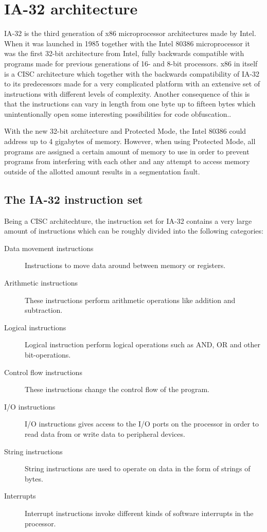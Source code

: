 \documentclass[11pt,twoside]{eitExjobb}
\begin{document}
\section{IA-32 architecture}
IA-32 is the third generation of  x86 microprocessor architectures made by Intel. When it was launched in 1985 together with the Intel 80386 microprocessor it was the first 32-bit architecture from Intel, fully backwards compatible with programs made for previous generations of 16- and 8-bit processors. x86 in itself is a CISC architecture which together with the backwards compatibility of IA-32 to its predecessors made for a very complicated platform with an extensive set of instructions with different levels of complexity. Another consequence of this is that the instructions can vary in length from one byte up to fifteen bytes which unintentionally open some interesting possibilities for code obfuscation.. 

With the new 32-bit architecture and Protected Mode, the Intel 80386 could address up to 4 gigabytes of memory. However, when using Protected Mode, all programs are assigned a certain amount of memory to use in order to prevent programs from interfering with each other and any attempt to access memory outside of the allotted amount results in a segmentation fault.

\subsection{The IA-32 instruction set}
Being a CISC architechture, the instruction set for IA-32 contains a very large amount of instructions which can be roughly divided into the following categories:\cite{x86quickguide}\cite{artofassembly} 

\begin{description}
\item[Data movement instructions] Instructions to move data around between memory or registers. 
\item[Arithmetic instructions] These instructions perform arithmetic operations like addition and subtraction.
\item[Logical instructions] Logical instruction perform logical operations such as AND, OR and other bit-operations.
\item[Control flow instructions] These instructions change the control flow of the program.
\item[I/O instructions] I/O instructions gives access to the I/O ports on the processor in order to read data from or write data to peripheral devices.
\item[String instructions] String instructions are used to operate on data in the form of strings of bytes.
\item[Interrupts] Interrupt instructions invoke different kinds of software interrupts in the processor.
\end{description}
\end{document}
